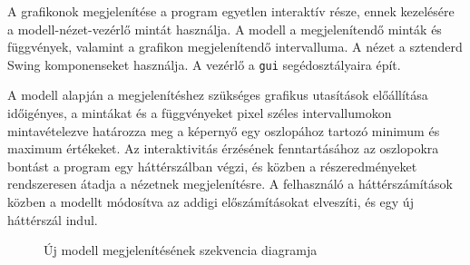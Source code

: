 A grafikonok megjelenítése a program egyetlen interaktív része, ennek kezelésére a modell-nézet-vezérlő mintát használja.
A modell a megjelenítendő minták és függvények, valamint a grafikon megjelenítendő intervalluma.
A nézet a sztenderd Swing komponenseket használja.
A vezérlő a \texttt{gui} segédosztályaira épít.

A modell alapján a megjelenítéshez szükséges grafikus utasítások előállítása időigényes, a mintákat és a függvényeket pixel széles intervallumokon mintavételezve határozza meg a képernyő egy oszlopához tartozó minimum és maximum értékeket.
Az interaktivitás érzésének fenntartásához az oszlopokra bontást a program egy háttérszálban végzi, és közben a részeredményeket rendszeresen átadja a nézetnek megjelenítésre.
A felhasználó a háttérszámítások közben a modellt módosítva az addigi előszámításokat elveszíti, és egy új háttérszál indul.

\begin{figure}[H]
\centering
\caption{Új modell megjelenítésének szekvencia diagramja}
\end{figure}

